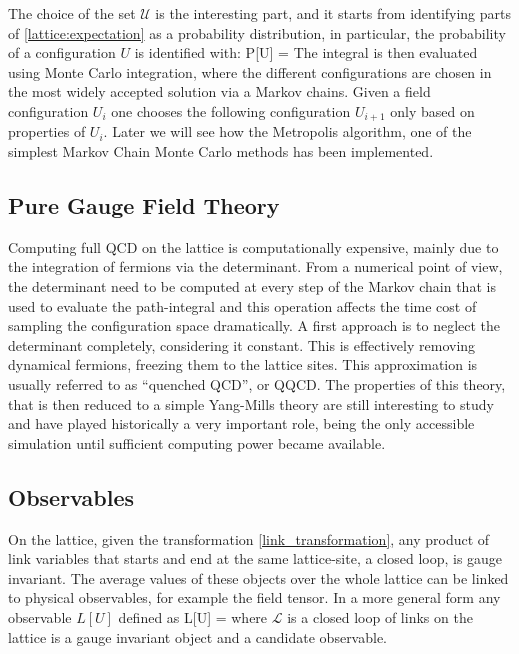 The choice of the set $\mathcal{U}$ is the interesting part, and it starts from identifying parts of \ref{lattice:expectation} as a probability distribution, in particular, the probability of a configuration $U$ is identified with:
\beq
    P[U] = 
\eeq 
The integral is then evaluated using Monte Carlo integration, where the different configurations are chosen in the most widely accepted solution via a Markov chains. Given a field configuration $U_i$ one chooses the following configuration $U_{i+1}$ only based on properties of $U_i$. Later we will see how the Metropolis algorithm, one of the simplest Markov Chain Monte Carlo methods has been implemented. 

\subsection{Pure Gauge Field Theory}
Computing full QCD on the lattice is computationally expensive, mainly due to the integration of fermions via the determinant. From a numerical point of view, the determinant need to be computed at every step of the Markov chain that is used to evaluate the path-integral and this operation affects the time cost of sampling the configuration space dramatically. A first approach is to neglect the determinant completely, considering it constant. This is effectively removing dynamical fermions, freezing them to the lattice sites. This approximation is usually referred to as ``quenched QCD'', or QQCD. The properties of this theory, that is then reduced to a simple Yang-Mills theory are still interesting to study and have played historically a very important role, being the only accessible simulation until sufficient computing power became available.

\subsection{Observables}
On the lattice, given the transformation \ref{link_transformation}, any product of link variables that starts and end at the same lattice-site, a closed loop, is gauge invariant. The average values of these objects over the whole lattice can be linked to physical observables, for example the field tensor. In a more general form any observable $L[U]$ defined as
\beq
    L[U] = \Tr {}
\eeq
where $\mathcal{L}$ is a closed loop of links on the lattice is a gauge invariant object and a candidate observable. 

